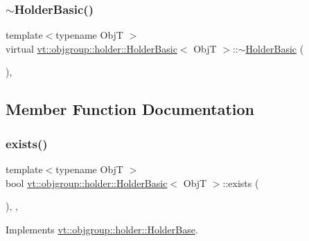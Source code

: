 \subsubsection{\texorpdfstring{$\sim$\+Holder\+Basic()}{~HolderBasic()}}
{\footnotesize\ttfamily template$<$typename ObjT $>$ \\
virtual \hyperlink{structvt_1_1objgroup_1_1holder_1_1_holder_basic}{vt\+::objgroup\+::holder\+::\+Holder\+Basic}$<$ ObjT $>$\+::$\sim$\hyperlink{structvt_1_1objgroup_1_1holder_1_1_holder_basic}{Holder\+Basic} (\begin{DoxyParamCaption}{ }\end{DoxyParamCaption})\hspace{0.3cm}{\ttfamily [virtual]}, {\ttfamily [default]}}



\subsection{Member Function Documentation}
\mbox{\label{structvt_1_1objgroup_1_1holder_1_1_holder_basic_ab52459a275afea84f6650d206fe5b3dc}} 
\subsubsection{\texorpdfstring{exists()}{exists()}}
{\footnotesize\ttfamily template$<$typename ObjT $>$ \\
bool \hyperlink{structvt_1_1objgroup_1_1holder_1_1_holder_basic}{vt\+::objgroup\+::holder\+::\+Holder\+Basic}$<$ ObjT $>$\+::exists (\begin{DoxyParamCaption}{ }\end{DoxyParamCaption})\hspace{0.3cm}{\ttfamily [inline]}, {\ttfamily [override]}, {\ttfamily [virtual]}}



Implements \hyperlink{structvt_1_1objgroup_1_1holder_1_1_holder_base_afeebbe358baf0b2bfea57f52807be564}{vt\+::objgroup\+::holder\+::\+Holder\+Base}.

\mbox{\label{structvt_1_1objgroup_1_1holder_1_1_holder_basic_af1d605b64e5f9d77d4b291c402133f3f}} 

